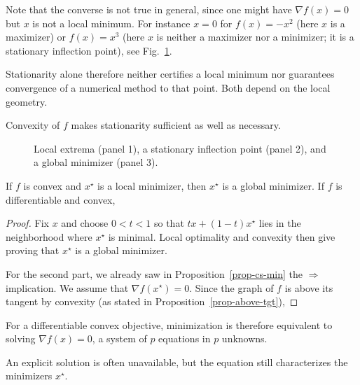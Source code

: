 Note that the converse is not true in general, since one might have $\nabla f(x)=0$ but $x$ is not a local minimum. For instance $x=0$ for $f(x)=-x^2$ (here $x$ is a maximizer) or $f(x)=x^3$ (here $x$ is neither a maximizer nor a minimizer; it is a stationary inflection point), see Fig.~\ref{fig-first-order}.
 
Stationarity alone therefore neither certifies a local minimum nor guarantees convergence of a numerical method to that point. Both depend on the local geometry.
 
Convexity of $f$ makes stationarity sufficient as well as necessary.

\begin{figure}[tbp]
\centering
{}\hfill
{}\hfill
{}
\caption{Local extrema (panel 1), a stationary inflection point (panel 2), and a global minimizer (panel 3).}
\label{fig-first-order}
\end{figure}


\begin{prop} 
If $f$ is convex and $x^\star$ is a local minimizer, then $x^\star$ is a global minimizer.
If $f$ is differentiable and convex, 
\end{prop}
\begin{proof}
Fix $x$ and choose $0<t<1$ so that $tx+(1-t)x^\star$ lies in the neighborhood where $x^\star$ is minimal. Local optimality and convexity then give
proving that $x^\star$ is a global minimizer.

For the second part, we already saw in Proposition~\ref{prop-cs-min} the $\Rightarrow$ implication. We assume that $\nabla f(x^\star)=0$. Since the graph of $f$ is above its tangent by convexity (as stated in Proposition~\ref{prop-above-tgt}),
\end{proof}

For a differentiable convex objective, minimization is therefore equivalent to solving $\nabla f(x)=0$, a system of $p$ equations in $p$ unknowns.
 
An explicit solution is often unavailable, but the equation still characterizes the minimizers $x^\star$.



